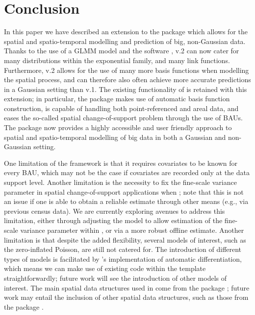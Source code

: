 \documentclass[nojss]{jss}
\begin{document}
\section{Conclusion}
\label{SEC:Conclusion}


In this paper we have described an extension to the  package  which allows for the spatial and spatio-temporal modelling and prediction of big, non-Gaussian data. 
Thanks to the use of a GLMM model and the software ,  v.2 can now cater for many distributions within the exponential family, and many link functions. 
Furthermore,  v.2 allows for the use of many more basis functions when modelling the spatial process, and can therefore also often achieve more accurate predictions in a Gaussian setting than  v.1. 
The existing functionality of  is retained with this extension; in particular, the package makes use of automatic basis function construction, is capable of handling both point-referenced and areal data, and eases the so-called spatial change-of-support problem through the use of BAUs.
The package now provides a highly accessible and user friendly approach to spatial and spatio-temporal modelling of big data in both a Gaussian and non-Gaussian setting.


One limitation of the framework is that it requires covariates to be known for every BAU, which may not be the case if covariates are recorded only at the data support level.
 Another limitation is the necessity to fix the fine-scale variance parameter in spatial change-of-support applications when ; note that this is not an issue if one is able to obtain a reliable estimate through other means (e.g., via previous census data). 
 We are currently exploring avenues to address this limitation, either through adjusting the model to allow estimation of the fine-scale variance parameter within , or via a more robust offline estimate.
Another limitation is that despite the added flexibility, several models of interest, such as the zero-inflated Poisson, are still not catered for. 
 The introduction of different types of models is facilitated by 's implementation of automatic differentiation, which means we can make use of existing code within the  template straightforwardly; future work will see the introduction of other models of interest.   
 The main spatial data structures used in  come from the package  \citep{Pebesma_2005_sp_package}; future work may entail the inclusion of other spatial data structures, such as those from the package  \citep{Pebesma_2018_sf_package}.
\end{document}
